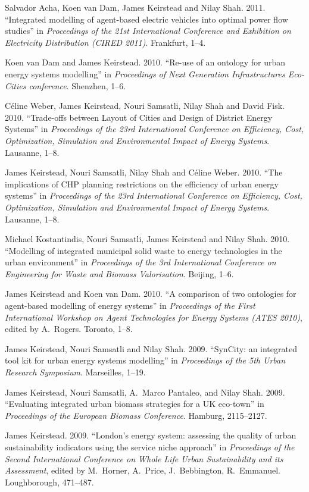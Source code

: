 \documentclass[11pt,a4paper]{article}
\begin{document}
\ind Salvador Acha, Koen van Dam, James Keirstead and Nilay Shah. 2011. ``Integrated modelling of agent-based electric vehicles into optimal power flow studies'' in \emph{Proceedings of the 21st International Conference and Exhibition on Electricity Distribution (CIRED 2011)}.  Frankfurt, 1--4.

\ind Koen van Dam and James Keirstead. 2010. ``Re-use of an ontology for urban energy systems modelling'' in \emph{Proceedings of Next Generation Infrastructures Eco-Cities conference}.  Shenzhen, 1--6.

\ind C\'{e}line Weber, James Keirstead, Nouri Samsatli, Nilay Shah and David Fisk. 2010. ``Trade-offs between Layout of Cities and Design of District Energy Systems'' in \emph{Proceedings of the 23rd International Conference on Efficiency, Cost, Optimization, Simulation and Environmental Impact of Energy Systems}.  Lausanne, 1--8.

\ind James Keirstead, Nouri Samsatli, Nilay Shah and C\'{e}line Weber. 2010. ``The implications of CHP planning restrictions on the efficiency of urban energy systems'' in \emph{Proceedings of the 23rd International Conference on Efficiency, Cost, Optimization, Simulation and Environmental Impact of Energy Systems}.  Lausanne, 1--8.

\ind Michael Kostantindis, Nouri Samsatli, James Keirstead and Nilay Shah. 2010. ``Modelling of integrated municipal solid waste to energy technologies in the urban environment'' in \emph{Proceedings of the 3rd International Conference on Engineering for Waste and Biomass Valorisation}.  Beijing, 1--6.

\ind James Keirstead and Koen van Dam. 2010. ``A comparison of two ontologies for agent-based modelling of energy systems'' in \emph{Proceedings of the First International Workshop on Agent Technologies for Energy Systems (ATES 2010)}, edited by A.\ Rogers. Toronto, 1--8. 

\ind James Keirstead, Nouri Samsatli and Nilay Shah. 2009. ``SynCity: an integrated tool kit for urban energy systems modelling'' in \emph{Proceedings of the 5th Urban Research Symposium}.  Marseilles, 1--19.

\ind James Keirstead, Nouri Samsatli, A.\ Marco Pantaleo, and Nilay Shah. 2009. ``Evaluating integrated urban biomass strategies for a UK eco-town'' in \emph{Proceedings of the European Biomass Conference}.  Hamburg, 2115--2127.

\ind James Keirstead. 2009. ``London's energy system: assessing the quality of urban sustainability indicators using the service niche approach'' in \emph{Proceedings of the Second International Conference on Whole Life Urban Sustainability and its Assessment}, edited by M.\ Horner, A.\ Price, J.\ Bebbington, R.\ Emmanuel.  Loughborough, 471--487.
\end{document}
